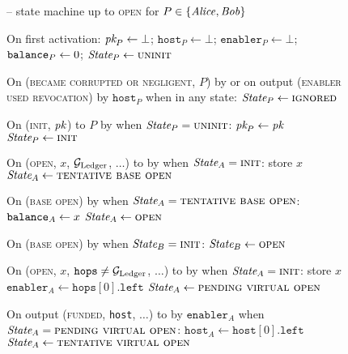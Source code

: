 \begin{figure}[H]
  \begin{systembox}{\fchan{} -- state machine up to \textsc{open} for $P \in
  \{\mathit{Alice}, \mathit{Bob}\}$}
    \begin{algorithmic}[1]
      \State On first activation:
      \label{code:functionality:state-machine:boot}
      \Indent
        \State $\textit{pk}_{P} \gets \bot$; $\texttt{host}_P \gets \bot$;
        $\texttt{enabler}_P \gets \bot$; $\texttt{balance}_{P} \gets 0$;
        \State $\itistate_P \gets \textsc{uninit}$
      \EndIndent
      \Statex

      \State On (\textsc{became corrupted or negligent}, $P$) by \adversary or
      on output (\textsc{enabler used revocation}) by $\texttt{host}_P$ when in
      any state:
      \Indent
        \State $\itistate_P \gets \textsc{ignored}$
      \EndIndent
      \Statex

      \State On (\textsc{init}, $\textit{pk}_{}$) to $P$ by \environment when
      $\itistate_P = \textsc{uninit}$:
      \Indent
        \State $\textit{pk}_{P} \gets \textit{pk}_{}$
        \State $\itistate_P \gets \textsc{init}$
      \EndIndent
      \Statex

      \State On (\textsc{open}, $x$, $\mathcal{G}_{\mathrm{Ledger}}$, $\dots$) to \alice by
      \environment when $\itistate_A = \textsc{init}$:
      \Indent
        \State store $x$
        \State $\itistate_A \gets \textsc{tentative base open}$
      \EndIndent
      \Statex

      \State On (\textsc{base open}) by \adversary when $\itistate_A =
      \textsc{tentative base open}$:
      \Indent
        \State $\texttt{balance}_{A} \gets x$
        \State $\itistate_A \gets \textsc{open}$
      \EndIndent
      \Statex

      \State On (\textsc{base open}) by \adversary when $\itistate_B =
      \textsc{init}$:
      \label{code:functionality:state-machine:when-open-bob}
      \Indent
        \State $\itistate_B \gets \textsc{open}$
      \EndIndent
      \Statex

      \State On (\textsc{open}, $x$, $\texttt{hops} \neq \mathcal{G}_{\mathrm{Ledger}}$, $\dots$) to
      \alice by \environment when $\itistate_A = \textsc{init}$:
      \Indent
        \State store $x$
        \State $\texttt{enabler}_A \gets \texttt{hops}[0].\texttt{left}$
        \State $\itistate_A \gets \textsc{pending virtual open}$
      \EndIndent
      \Statex

      \State On output (\textsc{funded}, \texttt{host}, $\dots$) to \alice by
      $\texttt{enabler}_A$ when $\itistate_A = \textsc{pending virtual open}$:
      \Indent
        \State $\texttt{host}_A \gets \texttt{host}[0].\texttt{left}$
        \State $\itistate_A \gets \textsc{tentative virtual open}$
      \EndIndent
      \Statex


\end{algorithmic}
\end{systembox}
\end{figure}
